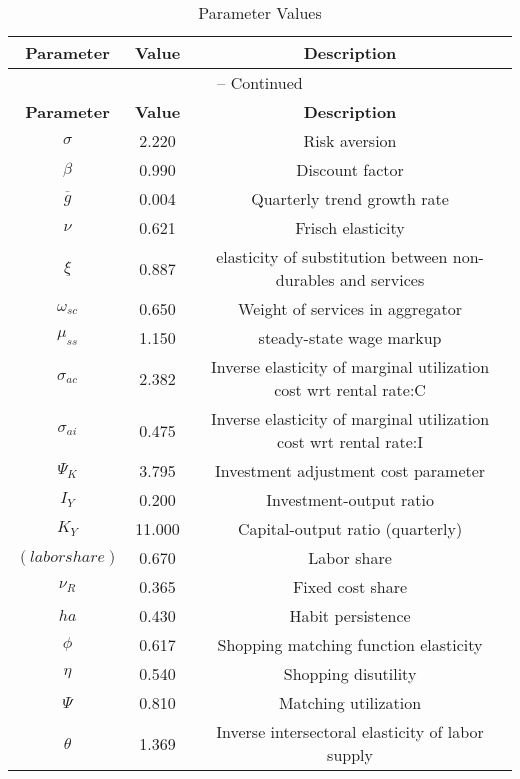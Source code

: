 \begin{center}
\begin{longtable}{ccc}
\caption{Parameter Values}\\%
\toprule%
\multicolumn{1}{c}{\textbf{Parameter}} &
\multicolumn{1}{c}{\textbf{Value}} &
 \multicolumn{1}{c}{\textbf{Description}}\\%
\midrule%
\endfirsthead
\multicolumn{3}{c}{{\tablename} \thetable{} -- Continued}\\%
\midrule%
\multicolumn{1}{c}{\textbf{Parameter}} &
\multicolumn{1}{c}{\textbf{Value}} &
  \multicolumn{1}{c}{\textbf{Description}}\\%
\midrule%
\endhead
${\sigma}$ 	 & 	 2.220 	 & 	 Risk aversion\\
${\beta}$ 	 & 	 0.990 	 & 	 Discount factor\\
${\overline{g}}$ 	 & 	 0.004 	 & 	 Quarterly trend growth rate\\
$\nu$ 	 & 	 0.621 	 & 	 Frisch elasticity\\
$\xi$ 	 & 	 0.887 	 & 	 elasticity of substitution between non-durables and services\\
$\omega_{sc}$ 	 & 	 0.650 	 & 	 Weight of services in aggregator\\
$\mu_{ss}$ 	 & 	 1.150 	 & 	 steady-state wage markup\\
${\sigma_{ac}}$ 	 & 	 2.382 	 & 	 Inverse elasticity of marginal utilization cost wrt rental rate:C\\
${\sigma_{ai}}$ 	 & 	 0.475 	 & 	 Inverse elasticity of marginal utilization cost wrt rental rate:I\\
${\Psi_{K}}$ 	 & 	 3.795 	 & 	 Investment adjustment cost parameter\\
${I_Y}$ 	 & 	 0.200 	 & 	 Investment-output ratio\\
${K_Y}$ 	 & 	 11.000 	 & 	 Capital-output ratio (quarterly)\\
$(labor share)$ 	 & 	 0.670 	 & 	 Labor share\\
${\nu_R}$ 	 & 	 0.365 	 & 	 Fixed cost share\\
${ha}$ 	 & 	 0.430 	 & 	 Habit persistence\\
${\phi}$ 	 & 	 0.617 	 & 	 Shopping matching function elasticity\\
${\eta}$ 	 & 	 0.540 	 & 	 Shopping disutility\\
${\Psi}$ 	 & 	 0.810 	 & 	 Matching utilization\\
${\theta}$ 	 & 	 1.369 	 & 	 Inverse intersectoral elasticity of labor supply\\

\end{longtable}
\end{center}
